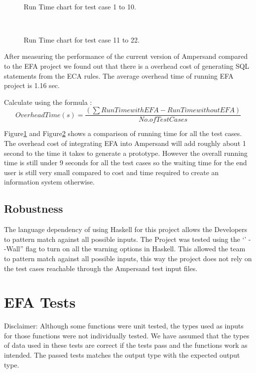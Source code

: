 \documentclass[12pt, svgnames]{article}
\begin{document}
\begin{figure}
  \centering
\caption{Run Time chart for test case 1 to 10.}~\label{fig:figure1}
\end{figure}


\begin{figure}
  \centering
\caption{Run Time chart for test case 11 to 22.}~\label{fig:figure2}
\end{figure}

After measuring the performance of the current version of Ampersand compared to the EFA project we found out that there is a overhead cost of generating SQL statements from the ECA rules. The average overhead time of running EFA project is 1.16 sec. 

Calculate using the formula : 
\begin{equation}
	Overhead Time(s) =\frac{\left ( \sum  Run Time with EFA - Run Time without EFA\right )}{ No. of Test Cases}
\end{equation}

Figure\ref{fig:figure1} and Figure\ref{fig:figure2} shows a comparison of running time for all the test cases. The overhead cost of integrating EFA into Ampersand will add roughly about 1 second to the time it takes to generate a prototype. However the overall running time is still under 9 seconds for all the test cases so the waiting time for the end user is still very small compared to cost and time required to create an information system otherwise.

\subsection{Robustness}
The language dependency of using Haskell for this project allows the Developers to pattern match against all possible inputs. The Project was tested using the `' - -Wall'' flag to turn on all the warning options in Haskell. This allowed the team to pattern match against all possible inputs, this way the project does not rely on the test cases reachable through the Ampersand test input files. 

\section{EFA Tests}
Disclaimer: Although some functions were unit tested, the types used as inputs 
for those functions were not individually tested. We have assumed that the 
types of data used in these tests are correct if the tests pass and the 
functions work as intended. The passed tests matches the output type with the 
expected output type.
\end{document}
